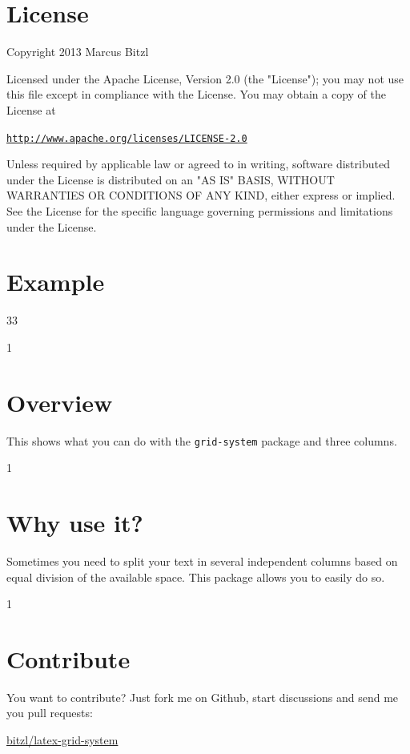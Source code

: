 \documentclass[DIV13,a4paper]{scrartcl}
\begin{document}
\section{License}
Copyright 2013 Marcus Bitzl

\medskip

Licensed under the Apache License, Version 2.0 (the "License");
you may not use this file except in compliance with the License.
You may obtain a copy of the License at

\medskip

\hspace*{1.2em}\href{http://www.apache.org/licenses/LICENSE-2.0}{\texttt{http://www.apache.org/licenses/LICENSE-2.0}}

\medskip

Unless required by applicable law or agreed to in writing, software
distributed under the License is distributed on an "AS IS" BASIS,
WITHOUT WARRANTIES OR CONDITIONS OF ANY KIND, either express or implied.
See the License for the specific language governing permissions and
limitations under the License.


\section{Example}
\begin{row}[cellsep=0.75cm]{3}{3}
	\begin{cell}{1}
	\section*{Overview}
	\vspace{-1.5ex}
	This shows what you can do with the \texttt{grid-system} package and three columns.
	\end{cell}
	\begin{cell}{1}
	\section*{Why use it?}
	\vspace{-1.5ex}
	Sometimes you need to split your text in several independent columns based on equal division of the available space. This package allows you to easily do so.
	\end{cell}
	\begin{cell}{1}
	\section*{Contribute}
	\vspace{-1.5ex}
	You want to contribute? Just fork me on Github, start discussions and send me you pull requests: 
	\begin{center}
	\href{https://github.com/bitzl/latex-grid-system}{\ttfamily bitzl/latex-grid-system}
	\end{center}
	\end{cell}
\end{row}
\end{document}
